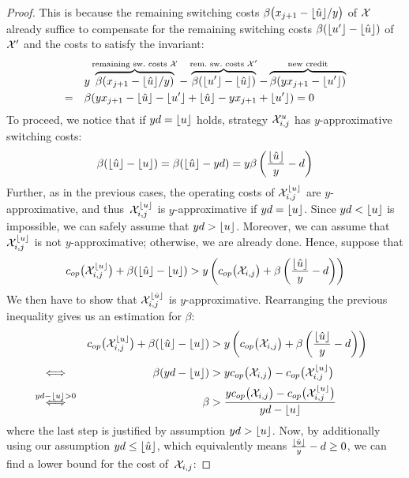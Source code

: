 \begin{proof}
This is because the remaining switching costs $\beta\bigl(x_{j+1}-\lfloor\hat{u}\rfloor/y\bigr)$ of $\mathcal{X}$ already suffice to compensate for the remaining switching costs $\beta(\lfloor u'\rfloor-\lfloor\hat{u}\rfloor)$ of $\mathcal{X}'$ and the costs to satisfy the invariant:
\begin{align*}
	&y\overbrace{\beta(x_{j+1}-\floor{\hat{u}}/y)}^{\text{remaining sw.\ costs }\mx}-\overbrace{\beta(\floor{u'}-\floor{\hat{u}})}^{\text{rem.\ sw.\ costs }\mx'}-\overbrace{\beta(yx_{j+1}-\floor{u'})}^{\text{new credit}}\\
	=\quad&\beta(yx_{j+1}-\floor{\hat{u}}-\floor{u'}+\floor{\hat{u}}-yx_{j+1}+\floor{u'})=0
\end{align*}
To proceed, we notice that if $yd=\lfloor u\rfloor$ holds, strategy $\mathcal{X}_{i,j}^u$ has $y$-approximative switching costs:
\begin{equation*}
	\beta(\lfloor\hat{u}\rfloor-\lfloor u\rfloor)=\beta(\lfloor\hat{u}\rfloor-yd)=y\beta\left(\frac{\lfloor\hat{u}\rfloor}{y}-d\right)
\end{equation*}
Further, as in the previous cases, the operating costs of $\mathcal{X}_{i,j}^{\lfloor u\rfloor}$ are $y$-approximative, and thus~$\mathcal{X}_{i,j}^{\lfloor u\rfloor}$ is $y$-approximative if $yd=\lfloor u\rfloor$. Since $yd<\lfloor u\rfloor$ is impossible, we can safely assume that $yd>\lfloor u\rfloor$. Moreover, we can assume that $\mathcal{X}_{i,j}^{\lfloor u\rfloor}$ is not $y$-approximative; otherwise, we are already done. Hence, suppose that 
\begin{equation*}
	c_{op}\bigl(\mathcal{X}_{i,j}^{\lfloor u\rfloor}\bigr)+\beta(\lfloor\hat{u}\rfloor-\lfloor u\rfloor)>y\left(c_{op}\bigl(\mathcal{X}_{i,j}\bigr)+\beta\left(\frac{\lfloor\hat{u}\rfloor}{y}-d\right)\right)
\end{equation*}
We then have to show that $\mathcal{X}_{i,j}^{\lfloor\hat{u}\rfloor}$ is $y$-approximative.
Rearranging the previous inequality gives us an estimation for $\beta$:
\begin{align*}
	&&\opcosts\bigl(\mx_{i,j}^{\floor{u}}\bigr)+\beta(\floor{\hat{u}}-\floor{u})&>y\left(\opcosts\bigl(\mx_{i,j}\bigr)+\beta\left(\frac{\floor{\hat{u}}}{y}-d\right)\right)
&\\
	&\stackrel{\phantom{yd-\floor{u}>0}}{\iff}&\beta(yd-\floor{u})&>y\opcosts\bigl(\mx_{i,j}\bigr)-\opcosts\bigl(\mx_{i,j}^{\floor{u}}\bigr)&\\
	&\stackrel{yd-\floor{u}>0}{\iff}&\beta&>\frac{y\opcosts\bigl(\mx_{i,j}\bigr)-\opcosts\bigl(\mx_{i,j}^{\floor{u}}\bigr)}{yd-\floor{u}}
\end{align*}
where the last step is justified by assumption $yd>\lfloor u\rfloor$. Now, by additionally using our assumption $yd\le\lfloor\hat{u}\rfloor$, which equivalently means $\frac{\lfloor\hat{u}\rfloor}{y}-d\ge0$, we can find a lower bound for the cost of~$\mathcal{X}_{i,j}$:

\end{proof}
